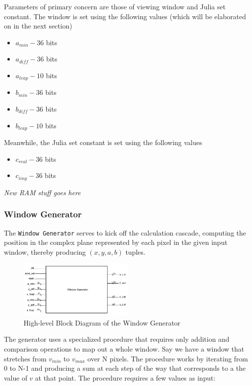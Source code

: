 \documentclass{article}
\begin{document}
Parameters of primary concern are those of viewing window and Julia set constant. The window is set using the 
following values (which will be elaborated on in the next section)

\begin{itemize}
\item $a_{min} - 36$ bits
\item $a_{diff} - 36$ bits
\item $a_{leap} - 10$ bits
\item $b_{min} - 36$ bits
\item $b_{diff} - 36$ bits
\item $b_{leap} - 10$ bits
\end{itemize}

Meanwhile, the Julia set constant is set using the following values

\begin{itemize}
\item $c_{real} - 36$ bits
\item $c_{img} - 36$ bits
\end{itemize}

\textit{New RAM stuff goes here}

\subsubsection{Window Generator}

The \texttt{Window Generator} serves to kick off the calculation cascade,
computing the position in the complex plane represented by each pixel in the
given input window, thereby producing 
$(x, y, a, b)$ tuples. 

\begin{figure}
  \centering
    \includegraphics[width=160pt]{block_diagrams/win_gen.pdf}
  \caption{High-level Block Diagram of the Window Generator}
\end{figure}


The generator uses a specialized procedure that requires only addition and comparison
operations to map out a whole window. Say we have a window that stretches from $v_{min}$ to $v_{max}$ over
N pixels. The procedure works by iterating from 0 to N-1 and producing a sum at each step of the way that
corresponds to a the value of $v$ at that point. The procedure requires a few values as input:
\end{document}
